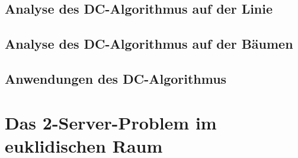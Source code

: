 \subsection{Analyse des DC-Algorithmus auf der Linie}

\subsection{Analyse des DC-Algorithmus auf der Bäumen}

\subsection{Anwendungen des DC-Algorithmus}


\section{Das 2-Server-Problem im euklidischen Raum}
